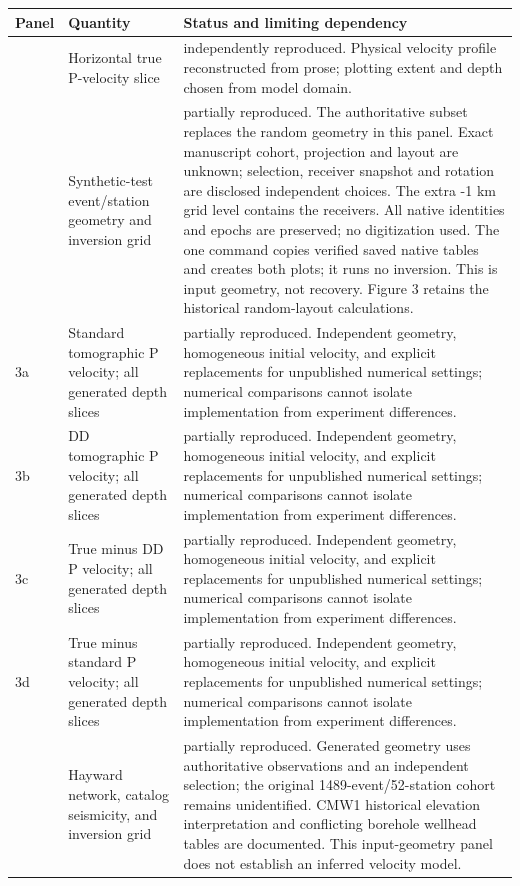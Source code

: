 \begin{longtable}{>{\raggedright\arraybackslash}p{}>{\raggedright\arraybackslash}p{}>{\raggedright\arraybackslash}p{}}\toprule Panel & Quantity & Status and limiting dependency\\\midrule\endhead
1 & Horizontal true P-velocity slice & independently reproduced. Physical velocity profile reconstructed from prose; plotting extent and depth chosen from model domain.\\
2 & Synthetic-test event/station geometry and inversion grid & partially reproduced. The authoritative subset replaces the random geometry in this panel. Exact manuscript cohort, projection and layout are unknown; selection, receiver snapshot and rotation are disclosed independent choices. The extra -1 km grid level contains the receivers. All native identities and epochs are preserved; no digitization used. The one command copies verified saved native tables and creates both plots; it runs no inversion. This is input geometry, not recovery. Figure 3 retains the historical random-layout calculations.\\
3a & Standard tomographic P velocity; all generated depth slices & partially reproduced. Independent geometry, homogeneous initial velocity, and explicit replacements for unpublished numerical settings; numerical comparisons cannot isolate implementation from experiment differences.\\
3b & DD tomographic P velocity; all generated depth slices & partially reproduced. Independent geometry, homogeneous initial velocity, and explicit replacements for unpublished numerical settings; numerical comparisons cannot isolate implementation from experiment differences.\\
3c & True minus DD P velocity; all generated depth slices & partially reproduced. Independent geometry, homogeneous initial velocity, and explicit replacements for unpublished numerical settings; numerical comparisons cannot isolate implementation from experiment differences.\\
3d & True minus standard P velocity; all generated depth slices & partially reproduced. Independent geometry, homogeneous initial velocity, and explicit replacements for unpublished numerical settings; numerical comparisons cannot isolate implementation from experiment differences.\\
4 & Hayward network, catalog seismicity, and inversion grid & partially reproduced. Generated geometry uses authoritative observations and an independent selection; the original 1489-event/52-station cohort remains unidentified. CMW1 historical elevation interpretation and conflicting borehole wellhead tables are documented. This input-geometry panel does not establish an inferred velocity model.\\

\end{longtable}
